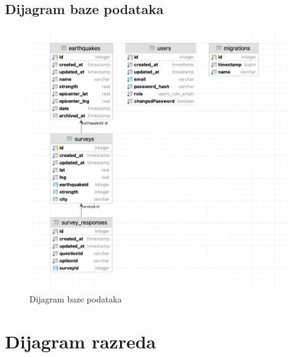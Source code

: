 			
			\subsection{Dijagram baze podataka}

				\begin{figure}[H]
					\includegraphics[width=\textwidth]{slike/tectonicDBDiagram.png} 
					\caption{Dijagram baze podataka}
					\label{fig:baza} 
				\end{figure}

			\eject
			
			
		\section{Dijagram razreda}
			

